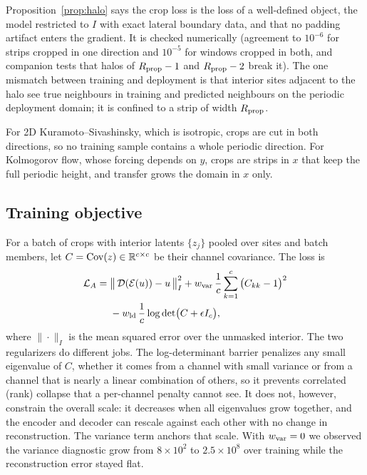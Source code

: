 Proposition~\ref{prop:halo} says the crop loss is the loss of a
well-defined object, the model restricted to $I$ with exact lateral
boundary data, and that no padding artifact enters the gradient. It is
checked numerically (agreement to $10^{-6}$ for strips cropped in one
direction and $10^{-5}$ for windows cropped in both, and companion tests
that halos of $R_{\mathrm{prop}}-1$ and $R_{\mathrm{prop}}-2$ break it). The one
mismatch between training and deployment is that interior sites adjacent
to the halo see true neighbours in training and predicted neighbours on
the periodic deployment domain; it is confined to a strip of width
$R_{\mathrm{prop}}$.

For 2D Kuramoto--Sivashinsky, which is isotropic, crops are cut in both
directions, so no training sample contains a whole periodic direction.
For Kolmogorov flow, whose forcing depends on $y$, crops are strips in
$x$ that keep the full periodic height, and transfer grows the domain in
$x$ only.

\subsection{Training objective}
\label{sec:objective}

For a batch of crops with interior latents $\{z_j\}$ pooled over sites
and batch members, let $C = \operatorname{Cov}(z)\in\mathbb{R}^{c\times c}$ be their channel
covariance. The loss is
\begin{equation}
\begin{split}
  \mathcal{L}_A ={}&
  \big\|\,\mathcal{D}(\mathcal{E}(u)) - u\,\big\|^2_{I}
  + w_{\mathrm{var}}\,\frac1c\sum_{k=1}^{c}\big(C_{kk}-1\big)^2\\
  &- w_{\mathrm{ld}}\,\frac1c\log\det\!\big(C + \epsilon I_c\big),
\end{split}
  \label{eq:stageA}
\end{equation}
where $\|\cdot\|_I$ is the mean squared error over the unmasked interior.
The two regularizers do different jobs. The log-determinant barrier
penalizes any small eigenvalue of $C$, whether it comes from a channel
with small variance or from a channel that is nearly a linear combination
of others, so it prevents correlated (rank) collapse that a per-channel
penalty cannot see. It does not, however, constrain the overall scale:
it decreases when all eigenvalues grow together, and the encoder and
decoder can rescale against each other with no change in reconstruction.
The variance term anchors that scale. With $w_{\mathrm{var}}=0$ we observed the
variance diagnostic grow from $8\times10^{2}$ to $2.5\times10^{8}$ over
training while the reconstruction error stayed flat.

